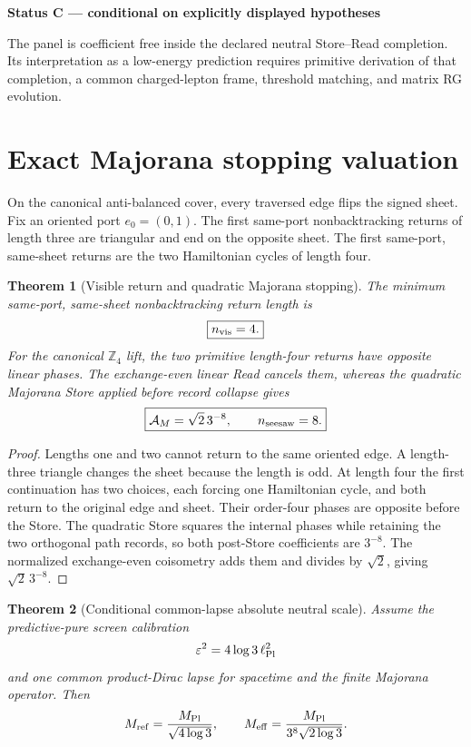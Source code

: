 \documentclass[11pt,oneside,openany]{book}
\numberwithin{equation}{chapter}
\newtheorem{theorem}{Theorem}[chapter]
\theoremstyle{definition}
\theoremstyle{remark}
\newcommand{\Zfour}{\mathbb Z_4}
\newenvironment{statusbox}[2]{%
  \par\medskip\noindent
  \begin{center}\begin{minipage}{0.94\textwidth}
  \colorbox{#1!8}{\parbox{\dimexpr\linewidth-2\fboxsep\relax}{\textbf{#2}}}\par\smallskip
}{%
  \end{minipage}\end{center}\medskip
}
\newcommand{\Conditional}[1]{\begin{statusbox}{CondColor}{Status C --- conditional on explicitly displayed hypotheses}#1\end{statusbox}}
\begin{document}
\Conditional{The panel is coefficient free inside the declared neutral
Store--Read completion.  Its interpretation as a low-energy prediction
requires primitive derivation of that completion, a common charged-lepton
frame, threshold matching, and matrix RG evolution.}

\section{Exact Majorana stopping valuation}

On the canonical anti-balanced cover, every traversed edge flips the signed
sheet.  Fix an oriented port \(e_0=(0,1)\).  The first same-port
nonbacktracking returns of length three are triangular and end on the
opposite sheet.  The first same-port, same-sheet returns are the two
Hamiltonian cycles of length four.

\begin{theorem}[Visible return and quadratic Majorana stopping]
\label{thm:majorana-stopping}
The minimum same-port, same-sheet nonbacktracking return length is
\[
 \boxed{n_{\rm vis}=4.}
\]
For the canonical \(\Zfour\) lift, the two primitive length-four returns have
opposite linear phases.  The exchange-even linear Read cancels them, whereas
the quadratic Majorana Store applied before record collapse gives
\[
 \boxed{
 \mathcal A_M=\sqrt2\,3^{-8},
 \qquad
 n_{\rm seesaw}=8.}
\]
\end{theorem}

\begin{proof}
Lengths one and two cannot return to the same oriented edge.  A length-three
triangle changes the sheet because the length is odd.  At length four the
first continuation has two choices, each forcing one Hamiltonian cycle, and
both return to the original edge and sheet.  Their order-four phases are
opposite before the Store.  The quadratic Store squares the internal phases
while retaining the two orthogonal path records, so both post-Store
coefficients are \(3^{-8}\).  The normalized exchange-even coisometry adds
them and divides by \(\sqrt2\), giving \(\sqrt2\,3^{-8}\).
\end{proof}

\begin{theorem}[Conditional common-lapse absolute neutral scale]
\label{cond:neutral-absolute-scale}
Assume the predictive-pure screen calibration
\[
 \varepsilon^2=4\log3\,\ell_{\rm Pl}^2
\]
and one common product-Dirac lapse for spacetime and the finite Majorana
operator.  Then
\[
 M_{\rm ref}
 =\frac{M_{\rm Pl}}{\sqrt{4\log3}},
 \qquad
 M_{\rm eff}
 =\frac{M_{\rm Pl}}{3^8\sqrt{2\log3}}.
\]
\end{theorem}
\end{document}
